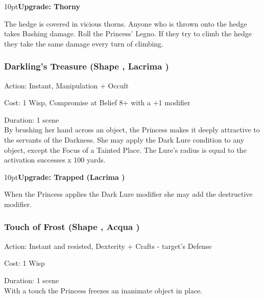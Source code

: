 \begin{myindentpar}{10pt}\textbf{Upgrade: Thorny}

The hedge is covered in vicious thorns. Anyone who is thrown onto the hedge takes Bashing damage. Roll the Princess' Legno. If they try to climb the hedge they take the same damage every turn of climbing.\end{myindentpar}

\subsubsection*{Darkling's Treasure (Shape \textbullet\textbullet, Lacrima \textbullet)}

\noindent Action: Instant, Manipulation + Occult

\noindent Cost: 1 Wisp, Compromise at Belief 8+ with a +1 modifier

\noindent Duration: 1 scene \\

\noindent By brushing her hand across an object, the Princess makes it deeply attractive to the servants of the Darkness. She may apply the Dark Lure condition to any object, except the Focus of a Tainted Place. The Lure's radius is equal to the activation successes x 100 yards.

\begin{myindentpar}{10pt}\textbf{Upgrade: Trapped (Lacrima \textbullet\textbullet)}

When the Princess applies the Dark Lure modifier she may add the destructive modifier.\end{myindentpar}


\subsubsection*{Touch of Frost (Shape \textbullet\textbullet, Acqua \textbullet)}
\noindent Action: Instant and resisted, Dexterity + Crafts - target's Defense

\noindent Cost: 1 Wisp

\noindent Duration: 1 scene\\

\noindent With a touch the Princess freezes an inanimate object in place.

